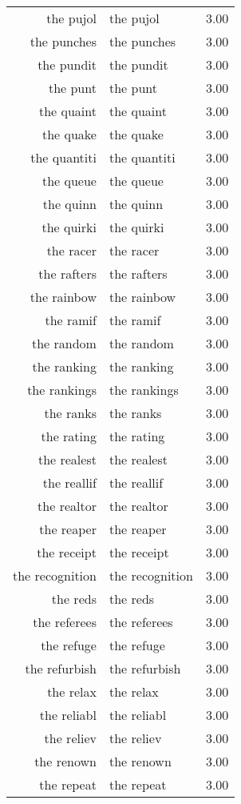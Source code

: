 \begin{table}[ht]
\begin{tabular}{rlr}
  the pujol & the pujol & 3.00 \\ 
  the punches & the punches & 3.00 \\ 
  the pundit & the pundit & 3.00 \\ 
  the punt & the punt & 3.00 \\ 
  the quaint & the quaint & 3.00 \\ 
  the quake & the quake & 3.00 \\ 
  the quantiti & the quantiti & 3.00 \\ 
  the queue & the queue & 3.00 \\ 
  the quinn & the quinn & 3.00 \\ 
  the quirki & the quirki & 3.00 \\ 
  the racer & the racer & 3.00 \\ 
  the rafters & the rafters & 3.00 \\ 
  the rainbow & the rainbow & 3.00 \\ 
  the ramif & the ramif & 3.00 \\ 
  the random & the random & 3.00 \\ 
  the ranking & the ranking & 3.00 \\ 
  the rankings & the rankings & 3.00 \\ 
  the ranks & the ranks & 3.00 \\ 
  the rating & the rating & 3.00 \\ 
  the realest & the realest & 3.00 \\ 
  the reallif & the reallif & 3.00 \\ 
  the realtor & the realtor & 3.00 \\ 
  the reaper & the reaper & 3.00 \\ 
  the receipt & the receipt & 3.00 \\ 
  the recognition & the recognition & 3.00 \\ 
  the reds & the reds & 3.00 \\ 
  the referees & the referees & 3.00 \\ 
  the refuge & the refuge & 3.00 \\ 
  the refurbish & the refurbish & 3.00 \\ 
  the relax & the relax & 3.00 \\ 
  the reliabl & the reliabl & 3.00 \\ 
  the reliev & the reliev & 3.00 \\ 
  the renown & the renown & 3.00 \\ 
  the repeat & the repeat & 3.00 \\ 

\end{tabular}
\end{table}
